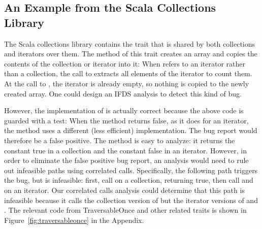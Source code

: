 \subsection{An Example from the Scala Collections Library}\label{sec:collex}
The Scala collections library contains the trait  that is
shared by both collections and iterators over them. 
The  method of this trait
creates an array and copies the contents of the collection or iterator into it:
When  refers to an iterator rather than a collection, the call to 
extracts all elements of the iterator to count them.
 At the call to ,
the iterator is already empty, so nothing is copied to the newly created array.
One could design an IFDS analysis to detect this kind of bug.

However, the implementation of  is actually correct because the above
code is guarded with a test: 
When the  method returns false, as it does for
an iterator, the  method uses a different
(less efficient) implementation. The bug report would therefore be a false positive. 
The  method is easy to analyze: it returns the constant
true in a collection and the constant false in an iterator. However, in order
to eliminate the false positive bug report, an analysis would need to rule out infeasible
paths using correlated calls. Specifically, the following path triggers the bug, but
is infeasible: first, call  on a collection, returning
true, then call  and  on an iterator. Our correlated
calls analysis could determine that this path is infeasible because it calls the
collection version of  but the iterator versions of
 and .
The relevant code from \textsf{TraversableOnce} and other related traits is shown
in Figure~\ref{fig:traversableonce} in the Appendix.
